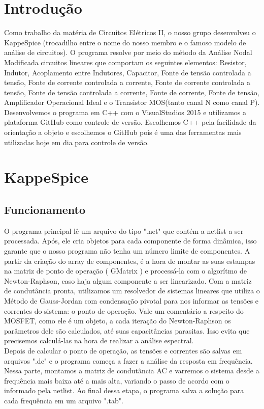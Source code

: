 \documentclass[a4paper,12pt]{article} %
\begin{document}
\section{Introdução}
Como trabalho da matéria de Circuitos Elétricos II, o nosso grupo desenvolveu o KappeSpice (trocadilho entre o nome do nosso membro e o famoso modelo de análise de circuitos). O programa resolve por meio do método da Análise Nodal Modificada circuitos lineares que comportam os seguintes elementos: Resistor, Indutor, Acoplamento entre Indutores, Capacitor, Fonte de tensão controlada a tensão, Fonte de corrente controlada a corrente, Fonte de corrente controlada a tensão, Fonte de tensão controlada a corrente, Fonte de corrente, Fonte de tensão, Amplificador Operacional Ideal e o Transistor MOS(tanto canal N como canal P).\\ 
Desenvolvemos o programa em C++ com o VisualStudios 2015 e utilizamos a plataforma GitHub como controle de versão. Escolhemos C++ pela facilidade da orientação a objeto e escolhemos o GitHub pois é uma das ferramentas mais utilizadas hoje em dia para controle de versão.

\section{KappeSpice}
\subsection{Funcionamento} %
 O programa principal lê um arquivo do tipo ".net" que contém a netlist a ser processada. Após, ele cria objetos para cada componente de forma dinâmica, isso garante que o nosso programa não tenha um número limite de componentes. A partir da criação do array de componentes, é a hora de montar as suas estampas na matriz de ponto de operação ( GMatrix ) e processá-la com o algorítmo de Newton-Raphson, caso haja algum componente a ser linearizado. Com a matriz de condutância pronta, utilizamos um resolvedor de sistemas lineares que utiliza o Método de Gauss-Jordan com condensação pivotal para nos informar as tensões e correntes do sistema: o ponto de operação. Vale um comentário a respeito do MOSFET, como ele é um objeto, a cada iteração do Newton-Raphson os parâmetros dele são calculados, até suas capacitâncias parasitas. Isso evita que precisemos calculá-las na hora de realizar a análise espectral.\\ 
 Depois de calcular o ponto de operação, as tensões e correntes são salvas em arquivos ".dc" e o programa começa a fazer a análise da resposta em frequência. Nessa parte, montamos a matriz de condutância AC e varremos o sistema desde a frequência mais baixa até a mais alta, variando o passo de acordo com o informado pela netlist. Ao final dessa etapa, o programa salva a solução para cada frequência em um arquivo ".tab".
\end{document}
